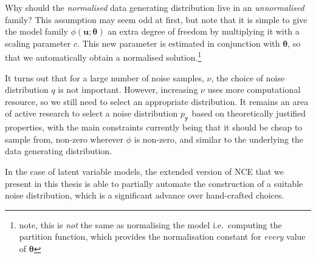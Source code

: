 \documentclass[11pt, oneside]{article}
\newcommand{\thetab}{{\boldsymbol{\theta}}}
\newcommand{\pnn}{\phi}
\newcommand{\pnoise}{p_{ \mathbf y}}
\renewcommand{\u}{{\mathbf u}}
\theoremstyle{definition}
\begin{document}
Why should the \emph{normalised} data generating distribution live in an \emph{unnormalised} family? This assumption may seem odd at first, but note that it is simple to give the model family $\pnn(\u; \thetab)$ an extra degree of freedom by multiplying it with a scaling parameter $c$. This new parameter is estimated in conjunction with $\thetab$, so that we automatically obtain a normalised solution.\footnote{note, this is \emph{not} the same as normalising the model i.e.\ computing the partition function, which provides the normalisation constant for \emph{every} value of $\thetab$}

It turns out that for a large number of noise samples, $\nu$, the choice of noise distribution $q$ is not important. However, increasing $\nu$ uses more computational resource, so we still need to select an appropriate distribution. It remains an area of active research to select a noise distribution $\pnoise$ based on theoretically justified properties, with the main constraints currently being that it should be cheap to sample from, non-zero wherever $\pnn$ is non-zero, and similar to the underlying the data generating distribution.

In the case of latent variable models, the extended version of NCE that we present in this thesis is able to partially automate the construction of a suitable noise distribution, which is a significant advance over hand-crafted choices.


\newpage
\end{document}
